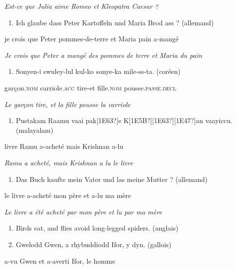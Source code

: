 {\itshape
Est-ce que Julia aime Romeo et Kleopatra Caesar ?}


\begin{enumerate}
\item \label{bkm:Ref305342478}Ich  glaube  dass  Peter  Kartoffeln  und  Maria  Brod  ass ?  (allemand)


\end{enumerate}
je  crois  que  Peter  pommes-de-terre  et  Maria  pain  a-mangé

{\itshape
Je crois que Peter a mangé des pommes de terre et Maria du pain} 


\begin{enumerate}
\item \label{bkm:Ref305343073}Sonyen-i  swuley-lul  kul-ko  sonye-ka  mile-ss-ta.  (coréen)


\end{enumerate}
garçon.\textsc{nom}  carriole.\textsc{acc}  tire-et  fille.\textsc{nom}  pousse.\textsc{passe.decl}

{\itshape
Le garçon tire, et la fille pousse la carriole}


\begin{enumerate}
\item \label{bkm:Ref305344064}Pustakam  Raamu  vaa{\ng}{\ng}i  pak[1E63?]e  K[1E5B?][1E63?][1E47?]an  vaayiccu.  (malayalam)


\end{enumerate}
livre  Ramu  a-acheté  mais  Krishnan  a-lu

{\itshape
Ramu a acheté, mais Krishnan a lu le livre}


\begin{enumerate}
\item \label{bkm:Ref305344415}Das  Buch  kaufte  mein  Vater  und  las  meine  Mutter ?  (allemand)


\end{enumerate}
le  livre  a-acheté  mon  père  et  a-lu  ma  mère

{\itshape
Le livre a été acheté par mon père et lu par ma mère} 


\begin{enumerate}
\item \label{bkm:Ref305344617}Birds eat, and flies avoid long-legged spiders.    (anglais)

\item \label{bkm:Ref305344965}Gwelodd  Gwen,  a  rhybuddiodd  Ifor,  y  dyn.  (gallois)


\end{enumerate}
a-vu  Gwen  et  a-averti  Ifor,  le  homme

